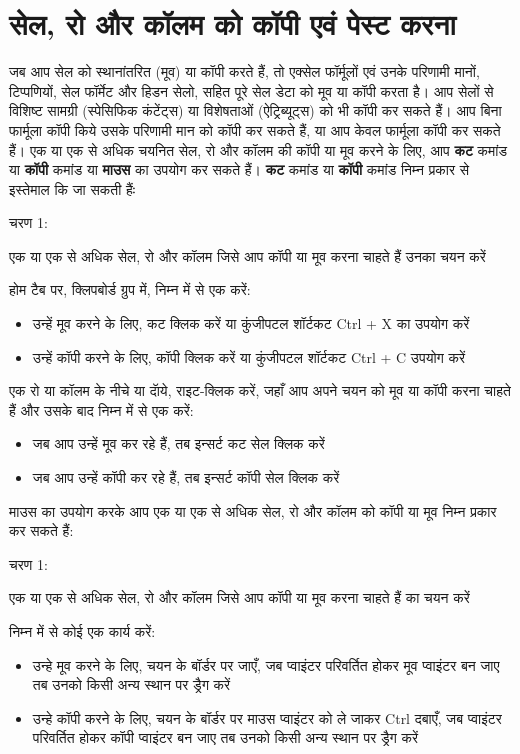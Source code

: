 \section{सेल, रो और कॉलम को कॉपी एवं पेस्ट करना}\label{id-1.33}

जब आप सेल को स्थानांतरित (मूव) या कॉपी करते हैं, तो एक्सेल फॉर्मूलों एवं उनके परिणामी मानों, टिप्पणियों, सेल फॉर्मेट और हिडन सेलो, सहित पूरे सेल डेटा को मूव या कॉपी करता है। आप सेलों से विशिष्ट सामग्री (स्पेसिफिक कंटेंट्स) या विशेषताओं (ऐट्रिब्यूट्स) को भी कॉपी कर सकते हैं। आप बिना फार्मूला कॉपी किये उसके परिणामी मान को कॉपी कर सकते हैं, या आप केवल फार्मूला कॉपी कर सकते हैं। एक या एक से अधिक चयनित सेल, रो और कॉलम की कॉपी या मूव करने के लिए, आप \textbf{कट} कमांड या \textbf{कॉपी} कमांड या \textbf{माउस} का उपयोग कर सकते हैं। \textbf{कट} कमांड या \textbf{कॉपी} कमांड निम्न प्रकार से इस्तेमाल कि जा सकती हैंः

\begin{descriptionSimple}{चरण 1:}
\item[चरण 1]  एक या एक से अधिक सेल, रो और कॉलम जिसे आप कॉपी या मूव करना चाहते हैं उनका चयन करें
\item[चरण 2]  होम टैब पर, क्लिपबोर्ड ग्रुप में, निम्न में से एक करें:
		\begin{itemize}
		\item उन्हें मूव करने के लिए, कट क्लिक करें या कुंजीपटल शॉर्टकट  {\rm Ctrl + X}  का उपयोग करें	
		\item उन्हें कॉपी करने के लिए, कॉपी क्लिक करें या कुंजीपटल शॉर्टकट  {\rm Ctrl + C}  उपयोग करें
		\end{itemize}	
\item[चरण 3] एक रो या कॉलम के नीचे या दॅाये, राइट-क्लिक करें, जहाँ आप अपने चयन को मूव या कॉपी करना चाहते हैं और उसके बाद निम्न में से एक करें:
		\begin{itemize}
		\item जब आप उन्हें मूव कर रहे हैं, तब इन्सर्ट कट सेल क्लिक करें
		\item जब आप उन्हें कॉपी कर रहे हैं, तब इन्सर्ट कॉपी सेल क्लिक करें
		\end{itemize}
\end{descriptionSimple}

माउस का उपयोग करके आप एक या एक से अधिक सेल, रो और कॉलम को कॉपी या मूव निम्न प्रकार कर सकते हैं:

\begin{descriptionSimple}{चरण 1:}
\item[चरण 1]  एक या एक से अधिक सेल, रो और कॉलम जिसे आप कॉपी या मूव करना चाहते हैं का चयन करें
\item[चरण 2]  निम्न में से कोई एक कार्य करें:
		\begin{itemize}
		\item उन्हे मूव करने के लिए, चयन के बॉर्डर पर जाएँ, जब प्वाइंटर परिवर्तित होकर मूव प्वाइंटर बन जाए तब उनको किसी अन्य स्थान पर ड्रैग करें
		\item उन्हे कॉपी करने के लिए, चयन के बॉर्डर पर माउस प्वाइंटर को ले जाकर  {\rm Ctrl}  दबाएँ, जब प्वाइंटर परिवर्तित होकर कॉपी प्वाइंटर बन जाए तब उनको किसी अन्य स्थान पर ड्रैग करें
		\end{itemize}
\end{descriptionSimple}

